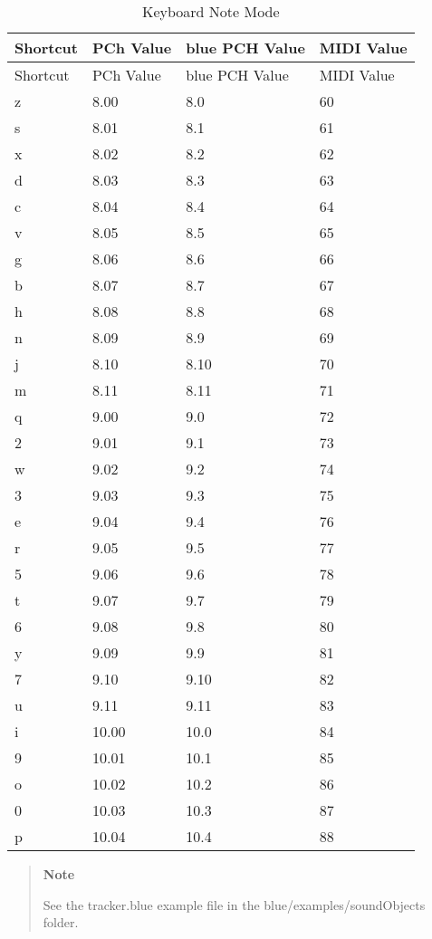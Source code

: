 \begin{longtable}[]{@{}llll@{}}
\caption{Keyboard Note Mode}\tabularnewline
\toprule
Shortcut & PCh Value & blue PCH Value & MIDI Value\tabularnewline
\midrule
\endfirsthead
\toprule
Shortcut & PCh Value & blue PCH Value & MIDI Value\tabularnewline
\midrule
\endhead
z & 8.00 & 8.0 & 60\tabularnewline
s & 8.01 & 8.1 & 61\tabularnewline
x & 8.02 & 8.2 & 62\tabularnewline
d & 8.03 & 8.3 & 63\tabularnewline
c & 8.04 & 8.4 & 64\tabularnewline
v & 8.05 & 8.5 & 65\tabularnewline
g & 8.06 & 8.6 & 66\tabularnewline
b & 8.07 & 8.7 & 67\tabularnewline
h & 8.08 & 8.8 & 68\tabularnewline
n & 8.09 & 8.9 & 69\tabularnewline
j & 8.10 & 8.10 & 70\tabularnewline
m & 8.11 & 8.11 & 71\tabularnewline
q & 9.00 & 9.0 & 72\tabularnewline
2 & 9.01 & 9.1 & 73\tabularnewline
w & 9.02 & 9.2 & 74\tabularnewline
3 & 9.03 & 9.3 & 75\tabularnewline
e & 9.04 & 9.4 & 76\tabularnewline
r & 9.05 & 9.5 & 77\tabularnewline
5 & 9.06 & 9.6 & 78\tabularnewline
t & 9.07 & 9.7 & 79\tabularnewline
6 & 9.08 & 9.8 & 80\tabularnewline
y & 9.09 & 9.9 & 81\tabularnewline
7 & 9.10 & 9.10 & 82\tabularnewline
u & 9.11 & 9.11 & 83\tabularnewline
i & 10.00 & 10.0 & 84\tabularnewline
9 & 10.01 & 10.1 & 85\tabularnewline
o & 10.02 & 10.2 & 86\tabularnewline
0 & 10.03 & 10.3 & 87\tabularnewline
p & 10.04 & 10.4 & 88\tabularnewline
\bottomrule
\end{longtable}

\begin{quote}
\textbf{Note}

See the tracker.blue example file in the blue/examples/soundObjects
folder.
\end{quote}
